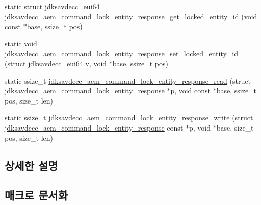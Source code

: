 \begin{DoxyCompactItemize}
\item 
static struct \hyperlink{structjdksavdecc__eui64}{jdksavdecc\+\_\+eui64} \hyperlink{group__command__lock__entity__response_ga6c883d3c78f38d820a01eb4c0bef8f1c}{jdksavdecc\+\_\+aem\+\_\+command\+\_\+lock\+\_\+entity\+\_\+response\+\_\+get\+\_\+locked\+\_\+entity\+\_\+id} (void const $\ast$base, ssize\+\_\+t pos)
\item 
static void \hyperlink{group__command__lock__entity__response_ga43b4447b6735760109c7c4761ea3732c}{jdksavdecc\+\_\+aem\+\_\+command\+\_\+lock\+\_\+entity\+\_\+response\+\_\+set\+\_\+locked\+\_\+entity\+\_\+id} (struct \hyperlink{structjdksavdecc__eui64}{jdksavdecc\+\_\+eui64} v, void $\ast$base, ssize\+\_\+t pos)
\item 
static ssize\+\_\+t \hyperlink{group__command__lock__entity__response_gabf8e59d01c0f0088b701f6191dd17b6d}{jdksavdecc\+\_\+aem\+\_\+command\+\_\+lock\+\_\+entity\+\_\+response\+\_\+read} (struct \hyperlink{structjdksavdecc__aem__command__lock__entity__response}{jdksavdecc\+\_\+aem\+\_\+command\+\_\+lock\+\_\+entity\+\_\+response} $\ast$p, void const $\ast$base, ssize\+\_\+t pos, size\+\_\+t len)
\item 
static ssize\+\_\+t \hyperlink{group__command__lock__entity__response_ga6a86ab08b302133124818259ca5c2dea}{jdksavdecc\+\_\+aem\+\_\+command\+\_\+lock\+\_\+entity\+\_\+response\+\_\+write} (struct \hyperlink{structjdksavdecc__aem__command__lock__entity__response}{jdksavdecc\+\_\+aem\+\_\+command\+\_\+lock\+\_\+entity\+\_\+response} const $\ast$p, void $\ast$base, size\+\_\+t pos, size\+\_\+t len)
\end{DoxyCompactItemize}


\subsection{상세한 설명}


\subsection{매크로 문서화}
